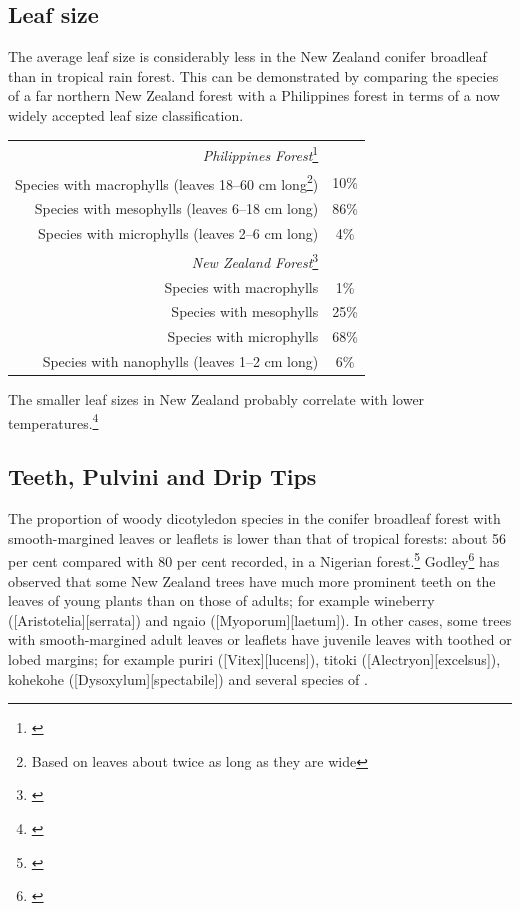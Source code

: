 \subsection{Leaf size}

The average leaf size is considerably less in the New Zealand conifer broadleaf than in tropical rain forest.
This can be demonstrated by comparing the species of a far northern New Zealand forest with a Philippines forest in terms of a now widely accepted leaf size classification.

\begin{xltabular}{0.8\textwidth}{ R c }
	\toprule
	\emph{Philippines Forest}\footnote{\cite{richards1952tropical}}\\
	Species with macrophylls (leaves 18--60 cm long\footnote{Based on leaves about twice as long as they are wide}) & 10\%\\
	Species with mesophylls (leaves 6--18 cm long) & 86\%\\
	Species with microphylls (leaves 2--6 cm long) & 4\%\\
	\emph{New Zealand Forest}\footnote{\cite{dawson1969lowland}}\\
	Species with macrophylls & 1\%\\
	Species with mesophylls & 25\%\\
	Species with microphylls & 68\%\\
	Species with nanophylls (leaves 1--2 cm long) & 6\%\\
	\bottomrule
\end{xltabular}

The smaller leaf sizes in New Zealand probably correlate with lower temperatures.\footnote{\cite{dawson1986floristic}}

\subsection{Teeth, Pulvini and Drip Tips}

The proportion of woody dicotyledon species in the conifer broadleaf forest with smooth-margined leaves or leaflets is lower than that of tropical forests: about 56 per cent compared with 80 per cent recorded, in a Nigerian forest.\footnote{\cite{richards1952tropical}}
Godley\footnote{\cite{godley1985paths}} has observed that some New Zealand trees have much more prominent teeth on the leaves of young plants than on those of adults; for example wineberry ([Aristotelia][serrata]) and ngaio ([Myoporum][laetum]).
In other cases, some trees with smooth-margined adult leaves or leaflets have juvenile leaves with toothed or lobed margins; for example puriri ([Vitex][lucens]), titoki ([Alectryon][excelsus]), kohekohe ([Dysoxylum][spectabile]) and several species of .

